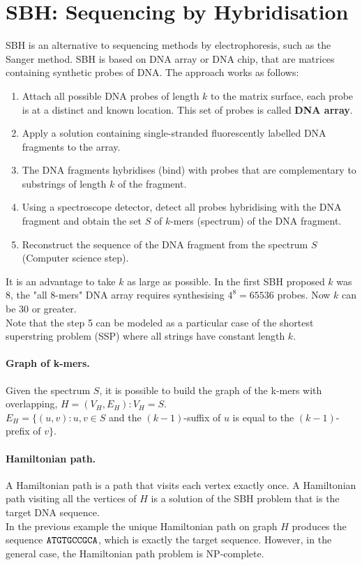 \section{SBH: Sequencing by Hybridisation}
SBH is an alternative to sequencing methods by electrophoresis, such as the Sanger method. SBH is based on DNA array or DNA chip, that are matrices containing synthetic probes of DNA. The approach works as follows:
\begin{enumerate}
	\item Attach all possible DNA probes of length $k$ to the matrix surface, each probe is at a distinct and known location. This set of probes is called \textbf{DNA array}.
	\item Apply a solution containing single-stranded fluorescently labelled DNA fragments to the array.
	\item The DNA fragments hybridises (bind) with probes that are complementary to substrings of length $k$ of the fragment.
	\item Using a spectroscope detector, detect all probes hybridising with the DNA fragment and obtain the set $S$ of $k$-mers (spectrum) of the DNA fragment.
	\item Reconstruct the sequence of the DNA fragment from the spectrum $S$ (Computer science step).
\end{enumerate}
It is an advantage to take $k$ as large as possible. In the first SBH proposed $k$ was 8, the "all 8-mers" DNA array requires synthesising $4^8 = 65536$ probes. Now $k$ can be 30 or greater.\\
Note that the step 5 can be modeled as a particular case of the shortest superstring problem (SSP) where all strings have constant length $k$.

\paragraph*{Graph of k-mers.} Given the spectrum $S$, it is possible to build the graph of the k-mers with overlapping, $H=(V_H, E_H): V_H = S$.\\
$E_H = \{(u,v): u,v \in S$ and the $(k-1)$-suffix of $u$ is equal to the $(k-1)$-prefix of $v\}$.

\paragraph*{Hamiltonian path.} A Hamiltonian path is a path that visits each vertex exactly once. 
A Hamiltonian path visiting all the vertices of $H$ is a solution of the SBH problem that is the target DNA sequence.\\
In the previous example the unique Hamiltonian path on graph $H$ produces the sequence $\verb|ATGTGCCGCA|$, which is exactly the target sequence. However, in the general case, the Hamiltonian path problem is NP-complete.

